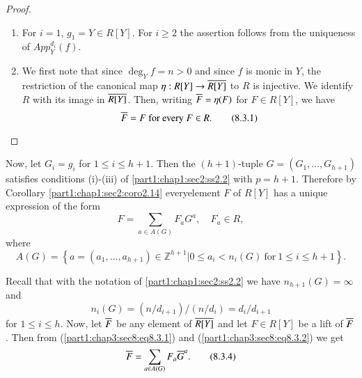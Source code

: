 \begin{proof}
  ~
\begin{enumerate}
\item For $i= 1$, $g_1= Y \in R[Y]$. For $i \geq 2$ the assertion follows from the uniqueness of $App^{d_i}_Y (f)$.
\item We first note that since $\deg_Y f= n> 0$ and since $f$ is monic in $Y$, the restriction of the canonical map $\eta: R[Y] \to \overline{R[Y]}$ to $R$ is injective. We identify $R$ with its image in $\overline{R[Y]}$. Then, writing $\overline{F} = \eta (F)$ for $F \in R[Y]$, we have
\begin{equation*}
  \overline{F} = F ~\text{for every}~ F \in R.\tag{8.3.1}\label{part1:chap3:sec8:eq8.3.1}
\end{equation*}
\end{enumerate}
\end{proof}

Now, let $G_i = g_i$ for $1 \leq i \leq h+1$. Then the $(h+1)$-tuple $G= (G_1, \ldots , G_{h+1})$ satisfies conditions (i)-(iii) of \ref{part1:chap1:sec2:ss2.2} with $p= h+1$. Therefore by Corollary \ref{part1:chap1:sec2:coro2.14} every\pageoriginale element $F$ of $R[Y]$ has a unique expression of the form
\begin{equation*}
  F= \sum_{a \in A(G)} F_a G^a, \quad F_a \in R, \tag{8.3.2} \label{part1:chap3:sec8:eq8.3.2}
\end{equation*}
where
$$
A(G) = \left\{ a = (a_1, \ldots , a_{h+1}) \in \mathbb{Z}^{h+1}\Big| 0 \leq a_i < n_i (G)~ \text{for}~ 1 \leq i \leq h+1\right\}.
$$

Recall that with the notation of \ref{part1:chap1:sec2:ss2.2} we have $n_{h+1} (G)= \infty$ and 
\begin{equation*}
  n_i (G) = (n/d_{i+1}) / (n/d_i) = d_i /d_{i+1} \tag{8.3.3} \label{part1:chap3:sec8:eq8.3.3}
\end{equation*}
for $1 \leq i \leq h$. Now, let $\overline{F}$ be any element of $\overline{R[Y]}$ and let $F \in R[Y]$ be a lift of $\overline{F}$. Then from (\ref{part1:chap3:sec8:eq8.3.1}) and (\ref{part1:chap3:sec8:eq8.3.2}) we get
\begin{equation*}
  \overline{F} = \sum_{a \in A(G)} F_a \overline{G}^a. \tag{8.3.4}\label{part1:chap3:sec8:eq8.3.4}
\end{equation*}

